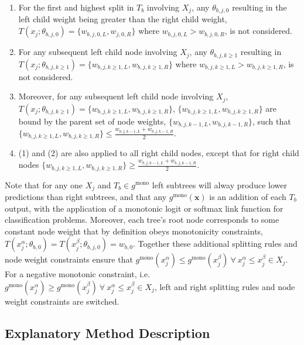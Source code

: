 \documentclass[information,article,submit,moreauthors,pdftex]{definitions/mdpi}
\begin{document}
\begin{enumerate}
\item For the first and highest split in $T_b$ involving $X_j$, any $\theta_{b,j,0}$ resulting in the left child weight being greater than the right child weight, $T(x_j; \theta_{b,j,0}) = \{w_{b,j,0,L}, w_{j,0,R}\}$ where $w_{b,j,0,L} > w_{b,j,0,R}$, is not considered. 
\item For any subsequent left child node involving $X_j$, any $\theta_{b,j, k\ge1}$ resulting in $T(x_j; \theta_{b,j,k\ge1}) = \{w_{b,j,k\ge1,L}, w_{b,j,k\ge1,R}\}$ where $w_{b,j,k\ge1,L} > w_{b,j,k\ge1,R}$, is not considered.
\item Moreover, for any subsequent left child node involving $X_j$, $T(x_j; \theta_{b,j,k\ge1}) = \{w_{b,j,k\ge1,L}, w_{b,j,k\ge1,R}\}$, $\{w_{b,j,k\ge1,L}, w_{b,j,k\ge1,R}\}$ are bound by the parent set of node weights, $\{w_{b,j,k-1,L}, w_{b,j,k-1, R}\}$, such that $ \{w_{b,j,k\ge1,L}, w_{b,j,k\ge1,R}\} \le \frac{w_{b,j,k-1,L} + w_{b,j,k-1,R}}{2}$.
\item (1) and (2) are also applied to all right child nodes, except that for right child nodes $\{w_{b,j,k\ge1,L}, w_{b,j,k\ge1,R}\} \ge \frac{w_{b,j,k-1,L} + w_{b,j,k-1,R}}{2}$.
\end{enumerate}

\noindent Note that for any one $X_j$ and $T_b \in g^{\text{mono}}$ left subtrees will alway produce lower predictions than right subtrees, and that any $g^{\text{mono}}(\mathbf{x})$ is an addition of each $T_b$ output, with the application of a monotonic logit or softmax link function for classification problems. Moreover, each tree's root node corresponds to some constant node weight that by definition obeys monotonicity constraints, $ T(x^{\alpha}_j; \theta_{b,0}) = T(x^{\beta}_j; \theta_{b,j,0}) = w_{b,0}$. Together these additional splitting rules and node weight constraints ensure that $g^{\text{mono}}(x^{\alpha}_j)  \le g^{\text{mono}}(x^{\beta}_j) ~\forall ~x^{\alpha}_j \le x^{\beta}_j \in X_j$. For a negative monotonic constraint, i.e. $g^{\text{mono}}(x^{\alpha}_j)  \ge g^{\text{mono}}(x^{\beta}_j) ~\forall ~x^{\alpha}_j \le x^{\beta}_j \in X_j$, left and right splitting rules and node weight constraints are switched.

\subsection{Explanatory Method Description}\label{ssec:expl}
\end{document}
